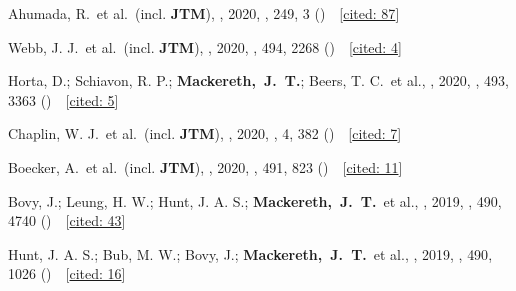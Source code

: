 \item[{\scriptsize12}]Ahumada, R.~et al.~(incl. \textbf{JTM}), , 2020, \apjs, {249}, 3 ()~~{\footnotesize[\href{http://adsabs.harvard.edu/abs/2020ApJS..249....3A}{cited: 87}]}

\item[{\scriptsize11}]Webb, J. J.~et al.~(incl. \textbf{JTM}), , 2020, \mnras, {494}, 2268 ()~~{\footnotesize[\href{http://adsabs.harvard.edu/abs/2020MNRAS.494.2268W}{cited: 4}]}

\item[{\scriptsize10}]Horta, D.; Schiavon, R. P.; \textbf{Mackereth,~J.~T.}; Beers, T. C.~et al., , 2020, \mnras, {493}, 3363 ()~~{\footnotesize[\href{http://adsabs.harvard.edu/abs/2020MNRAS.493.3363H}{cited: 5}]}

\item[{\scriptsize9}]Chaplin, W. J.~et al.~(incl. \textbf{JTM}), , 2020, \natureast, {4}, 382 ()~~{\footnotesize[\href{http://adsabs.harvard.edu/abs/2020NatAs...4..382C}{cited: 7}]}

\item[{\scriptsize8}]Boecker, A.~et al.~(incl. \textbf{JTM}), , 2020, \mnras, {491}, 823 ()~~{\footnotesize[\href{http://adsabs.harvard.edu/abs/2020MNRAS.491..823B}{cited: 11}]}

\item[{\scriptsize7}]Bovy, J.; Leung, H. W.; Hunt, J. A. S.; \textbf{Mackereth,~J.~T.}~et al., , 2019, \mnras, {490}, 4740 ()~~{\footnotesize[\href{http://adsabs.harvard.edu/abs/2019MNRAS.490.4740B}{cited: 43}]}

\item[{\scriptsize6}]Hunt, J. A. S.; Bub, M. W.; Bovy, J.; \textbf{Mackereth,~J.~T.}~et al., , 2019, \mnras, {490}, 1026 ()~~{\footnotesize[\href{http://adsabs.harvard.edu/abs/2019MNRAS.490.1026H}{cited: 16}]}

